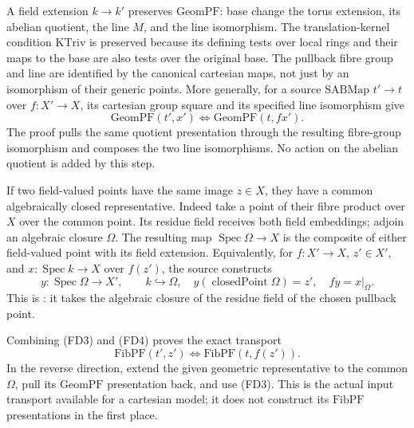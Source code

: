 A field extension \(k\to k'\) preserves \(\mathrm{GeomPF}\):
base change the torus extension, its abelian quotient,
the line \(M\), and the line isomorphism.
The translation-kernel condition \(\mathrm{KTriv}\)
is preserved because its defining tests over local
rings and their maps to the base are also tests over
the original base.
The pullback fibre group and line are identified by the
canonical cartesian maps, not just by an isomorphism
of their generic points.
More generally, for a source \(\mathrm{SABMap}\)
\(t'\to t\) over \(f:X'\to X\), its cartesian group
square and its specified line isomorphism give
\[
 \mathrm{GeomPF}(t',x')
         \iff\mathrm{GeomPF}(t,f x').
 \tag{FD3}\label{eq:faithful-geompf-cartesian}
\]
The proof pulls the same quotient presentation through
the resulting fibre-group isomorphism and composes
the two line isomorphisms.
No action on the abelian quotient is added by this step.

If two field-valued points have the same image \(z\in X\),
they have a common algebraically closed representative.
Indeed take a point of their fibre product over \(X\)
over the common point.
Its residue field receives both field embeddings;
adjoin an algebraic closure \(\Omega\).
The resulting map
\(\operatorname{Spec}\Omega\to X\) is the composite
of either field-valued point with its field extension.
Equivalently, for \(f:X'\to X\), \(z'\in X'\), and
\(x:\operatorname{Spec}k\to X\) over \(f(z')\), the
source constructs
\[
 y:\operatorname{Spec}\Omega\to X',\qquad k\hookrightarrow\Omega,
 \quad y(\operatorname{closedPoint}\Omega)=z',\quad
                                  f y=x|_\Omega .
 \tag{FD4}\label{eq:faithful-common-representative}
\]
This is : it takes the algebraic
closure of the residue field of the chosen pullback point.

Combining (FD3) and (FD4) proves the exact transport
\[
                  \mathrm{FibPF}(t',z')
                         \iff \mathrm{FibPF}(t,f(z')) .
 \tag{FD5}\label{eq:faithful-fibpf-cartesian}
\]
In the reverse direction, extend the given geometric
representative to the common \(\Omega\), pull its
\(\mathrm{GeomPF}\) presentation back, and use (FD3).
This is the actual input transport available for a
cartesian model; it does not construct its \(\mathrm{FibPF}\)
presentations in the first place.

